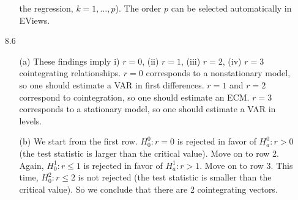 \documentclass[11pt,a4paper]{article}
\begin{document}
\begin{itemize}
\begin{enumerate}
the regression, $k=1, \ldots, p$). The order $p$ can be selected automatically
in EViews.
\end{enumerate}
\item[8.6]
\begin{enumerate}
\item[(a)] These findings imply i) $r=0$, (ii) $r=1$, (iii) $r=2$, (iv) $r=3$ cointegrating relationships. $r=0$ corresponds to a nonstationary model, so one should estimate a VAR in first differences. $r=1$ and $r=2$ correspond to cointegration, so one should estimate an ECM. $r=3$ corresponds to a stationary model, so one should estimate a VAR in levels.
\item[(b)] We start from the first row. $H^0_0:r=0$ is rejected in favor of $H^0_{a}:r>0$ (the test statistic is larger than the critical value). Move on to row 2. Again, $H^1_0:r\leq 1$ is rejected in favor of $H^1_{a}:r>1$. Move on to row 3. This time, $H^2_0:r\leq 2$ is not rejected (the test statistic is smaller than the critical value). So we conclude that there are 2 cointegrating vectors.
\end{enumerate}

\end{itemize}
\newpage
\end{document}

